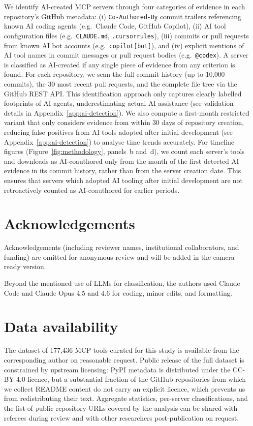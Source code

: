\documentclass[manuscript,screen,nonacm,oneside]{acmart}
\begin{document}
We identify AI-created MCP servers through four categories of evidence in each repository's GitHub metadata: (i) \texttt{Co-Authored-By} commit trailers referencing known AI coding agents (e.g.\ Claude Code, GitHub Copilot), (ii) AI tool configuration files (e.g.\ \texttt{CLAUDE.md}, \texttt{.cursorrules}), (iii) commits or pull requests from known AI bot accounts (e.g.\ \texttt{copilot[bot]}), and (iv) explicit mentions of AI tool names in commit messages or pull request bodies (e.g.\ \texttt{@codex}). A server is classified as AI-created if any single piece of evidence from any criterion is found. For each repository, we scan the full commit history (up to 10,000 commits), the 30 most recent pull requests, and the complete file tree via the GitHub REST API. This identification approach only captures clearly labelled footprints of AI agents, underestimating actual AI assistance (see validation details in Appendix~\ref{app:ai-detection}). We also compute a first-month restricted variant that only considers evidence from within 30 days of repository creation, reducing false positives from AI tools adopted after initial development (see Appendix~\ref{app:ai-detection}) to analyse time trends accurately. For timeline figures (Figure~\ref{fig:methodology}, panels~b and~d), we count each server's tools and downloads as AI-coauthored only from the month of the first detected AI evidence in its commit history, rather than from the server creation date. This ensures that servers which adopted AI tooling after initial development are not retroactively counted as AI-coauthored for earlier periods.

\section*{Acknowledgements}

Acknowledgements (including reviewer names, institutional collaborators, and funding) are omitted for anonymous review and will be added in the camera-ready version.

Beyond the mentioned use of LLMs for classification, the authors used Claude Code and Claude Opus 4.5 and 4.6 for coding, minor edits, and formatting.

\section*{Data availability}

The dataset of 177,436 MCP tools curated for this study is available from the corresponding author on reasonable request. Public release of the full dataset is constrained by upstream licensing: PyPI metadata is distributed under the CC-BY 4.0 licence, but a substantial fraction of the GitHub repositories from which we collect README content do not carry an explicit licence, which prevents us from redistributing their text. Aggregate statistics, per-server classifications, and the list of public repository URLs covered by the analysis can be shared with referees during review and with other researchers post-publication on request.
\end{document}

